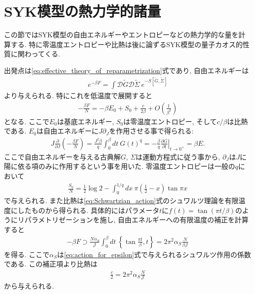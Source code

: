 \section{SYK模型の熱力学的諸量\label{sec:thermodynamics}}
この節ではSYK模型の自由エネルギーやエントロピーなどの熱力学的な量を計算する. 
特に零温度エントロピーや比熱は後に論ずるSYK模型の量子カオス的性質に関わってくる. 

出発点は\eqref{eq:effective_theory_of_reparametrization}式であり, 
自由エネルギーは
\begin{align}
	e^{-\beta F} = \int \mathcal{D}\tilde{G}\mathcal{D}\tilde{\Sigma}\ 
		e^{-S[\tilde{G}, \tilde{\Sigma}]}
\end{align}
より与えられる. 
特にこれを低温度で展開すると
\begin{align}
	-\frac{\beta F}{N}
	= -\beta E_0 + S_0 + \frac{c}{2\beta} + O\left(\frac{1}{\beta^2}\right)
\end{align}
となる. 
ここで$E_0$は基底エネルギー, $S_0$は零温度エントロピー, そして$c/\beta$は比熱である. 
$E_0$は自由エネルギーに$J\partial_J$を作用させる事で得られる:
\begin{align}
	J\frac{\partial}{\partial J}\left(-\frac{\beta F}{N}\right)
	= \frac{J^2\beta}{q}\int_0^{\beta}dt\ G(t)^q
	= -\frac{\beta}{q}\left.\frac{\partial G}{\partial t}\right|_{t\to 0^+}
	= \beta E.
\end{align}
ここで自由エネルギーを与える古典解$G$, $\Sigma$は運動方程式に従う事から, 
$\partial_J$は$J$に陽に依る項のみに作用するという事を用いた. 
零温度エントロピーは一般の$q$において
\begin{align}
	\frac{S_0}{N}
	= \frac{1}{2}\log 2 - \int_0^{1/q} dx\ \pi\left(\frac{1}{2} - x\right)\tan \pi x
\end{align}
で与えられる. 
また比熱は\eqref{eq:Schwartzian_action}式のシュワルツ理論を有限温度にしたものから得られる. 
具体的にはパラメータ$t$に$f(t) = \tan(\pi t / \beta)$のようにリパラメトリゼーションを施し, 
自由エネルギーへの有限温度の補正を計算すると
\begin{align}
	-\beta F \supset \frac{N \alpha_S}{\mathcal{J}}
		\int_0^{\beta} dt\ \left\{\tan \frac{\pi t}{\beta}, t\right\}
	= 2\pi^2\alpha_S\frac{N}{\beta \mathcal{J}}
\end{align}
を得る. 
ここで$\alpha_S$は\eqref{eq:action_for_epsilon}式で与えられるシュワルツ作用の係数である. 
この補正項より比熱は
\begin{align}
	\frac{c}{2} = 2\pi^2\alpha_S\frac{N}{\mathcal{J}}
	\label{eq:specific_heat}
\end{align}
から与えられる. 

\pagebreak